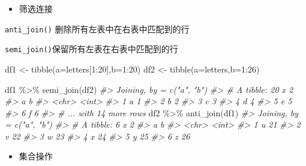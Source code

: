 \documentclass[
]{book}
\newenvironment{Shaded}{\begin{snugshade}}{\end{snugshade}}
\newcommand{\AttributeTok}[1]{\textcolor[rgb]{0.77,0.63,0.00}{#1}}
\newcommand{\CommentTok}[1]{\textcolor[rgb]{0.56,0.35,0.01}{\textit{#1}}}
\newcommand{\DecValTok}[1]{\textcolor[rgb]{0.00,0.00,0.81}{#1}}
\newcommand{\FunctionTok}[1]{\textcolor[rgb]{0.00,0.00,0.00}{#1}}
\newcommand{\NormalTok}[1]{#1}
\newcommand{\OtherTok}[1]{\textcolor[rgb]{0.56,0.35,0.01}{#1}}
\newcommand{\SpecialCharTok}[1]{\textcolor[rgb]{0.00,0.00,0.00}{#1}}
\providecommand{\tightlist}{%
  \setlength{\itemsep}{0pt}\setlength{\parskip}{0pt}}
\begin{document}
\begin{itemize}
\tightlist
\item
  筛选连接
\end{itemize}

\texttt{anti\_join()} 删除所有左表中在右表中匹配到的行

\texttt{semi\_join()}保留所有左表在右表中匹配到的行

\begin{Shaded}
\begin{Highlighting}[]
\NormalTok{df1 }\OtherTok{\textless{}{-}} \FunctionTok{tibble}\NormalTok{(}\AttributeTok{a=}\NormalTok{letters[}\DecValTok{1}\SpecialCharTok{:}\DecValTok{20}\NormalTok{],}\AttributeTok{b=}\DecValTok{1}\SpecialCharTok{:}\DecValTok{20}\NormalTok{)}
\NormalTok{df2 }\OtherTok{\textless{}{-}} \FunctionTok{tibble}\NormalTok{(}\AttributeTok{a=}\NormalTok{letters,}\AttributeTok{b=}\DecValTok{1}\SpecialCharTok{:}\DecValTok{26}\NormalTok{)}

\NormalTok{df1 }\SpecialCharTok{\%\textgreater{}\%} \FunctionTok{semi\_join}\NormalTok{(df2)}
\CommentTok{\#\textgreater{} Joining, by = c("a", "b")}
\CommentTok{\#\textgreater{} \# A tibble: 20 x 2}
\CommentTok{\#\textgreater{}   a         b}
\CommentTok{\#\textgreater{}   \textless{}chr\textgreater{} \textless{}int\textgreater{}}
\CommentTok{\#\textgreater{} 1 a         1}
\CommentTok{\#\textgreater{} 2 b         2}
\CommentTok{\#\textgreater{} 3 c         3}
\CommentTok{\#\textgreater{} 4 d         4}
\CommentTok{\#\textgreater{} 5 e         5}
\CommentTok{\#\textgreater{} 6 f         6}
\CommentTok{\#\textgreater{} \# ... with 14 more rows}
\NormalTok{df2 }\SpecialCharTok{\%\textgreater{}\%} \FunctionTok{anti\_join}\NormalTok{(df1)}
\CommentTok{\#\textgreater{} Joining, by = c("a", "b")}
\CommentTok{\#\textgreater{} \# A tibble: 6 x 2}
\CommentTok{\#\textgreater{}   a         b}
\CommentTok{\#\textgreater{}   \textless{}chr\textgreater{} \textless{}int\textgreater{}}
\CommentTok{\#\textgreater{} 1 u        21}
\CommentTok{\#\textgreater{} 2 v        22}
\CommentTok{\#\textgreater{} 3 w        23}
\CommentTok{\#\textgreater{} 4 x        24}
\CommentTok{\#\textgreater{} 5 y        25}
\CommentTok{\#\textgreater{} 6 z        26}
\end{Highlighting}
\end{Shaded}

\begin{itemize}
\tightlist
\item
  集合操作
\end{itemize}
\end{document}
